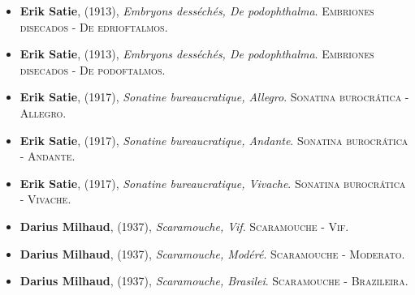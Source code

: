 \documentclass[paper=a4, fontsize=11pt, spanish]{scrartcl}
\numberwithin{equation}{section} %
\numberwithin{figure}{section} %
\numberwithin{table}{section} %
\begin{document}
\begin{itemize}
\item \textbf{Erik Satie}, (1913), \textit{Embryons desséchés, De podophthalma}.\textsc{ Embriones disecados - De edrioftalmos}. %
\item \textbf{Erik Satie}, (1913), \textit{Embryons desséchés, De podophthalma}.\textsc{ Embriones disecados - De podoftalmos}. %
\item \textbf{Erik Satie}, (1917), \textit{Sonatine bureaucratique, Allegro}.\textsc{ Sonatina burocrática - Allegro}. %
\item \textbf{Erik Satie}, (1917), \textit{Sonatine bureaucratique, Andante}.\textsc{ Sonatina burocrática - Andante}. %
\item \textbf{Erik Satie}, (1917), \textit{Sonatine bureaucratique, Vivache}.\textsc{ Sonatina burocrática - Vivache}. %
\item \textbf{Darius Milhaud}, (1937), \textit{Scaramouche, Vif}.\textsc{ Scaramouche - Vif}. %
\item \textbf{Darius Milhaud}, (1937), \textit{Scaramouche, Modéré}.\textsc{ Scaramouche - Moderato}. %
\item \textbf{Darius Milhaud}, (1937), \textit{Scaramouche, Brasilei}.\textsc{ Scaramouche - Brazileira}. %

\end{itemize}
\end{document}
